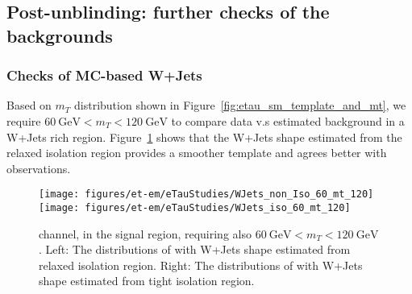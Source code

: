 \subsection{Post-unblinding: further checks of the backgrounds}
\label{sec:et_bkg_validation}



\subsubsection{Checks of MC-based W+Jets}
Based on $m_T$ distribution shown in
Figure~\ref{fig:etau_sm_template_and_mt}, we require $60~\text{GeV} <
m_T < 120~\text{GeV}$ to compare data v.s estimated background in a
W+Jets rich region. Figure~\ref{fig:60_mT_120} shows that the W+Jets
shape estimated from the relaxed \tauh isolation region provides a
smoother template and agrees better with observations.
\begin{figure}\centering
  \texttt{[image: figures/et-em/eTauStudies/WJets\_non\_Iso\_60\_mt\_120]}
  \texttt{[image: figures/et-em/eTauStudies/WJets\_iso\_60\_mt\_120]}
  \caption{\label{fig:60_mT_120} \teth channel, in the signal region,
    requiring also $60~\text{GeV} < m_T < 120~\text{GeV}$.  Left: The
    distributions of \meffetau with W+Jets shape estimated from
    relaxed \tauh isolation region. Right: The distributions of
    \meffetau with W+Jets shape estimated from tight \tauh isolation
    region.}
\end{figure}


